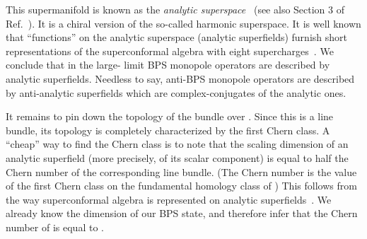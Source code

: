 \documentclass[a4paper,12pt, amsfonts, amssymb]{article}
\providecommand{\CC}{{\mathbb C}}
\providecommand{\PP}{{\mathbb P}}
\renewcommand{\L}{{\mathcal L}}
\begin{document}
This supermanifold is known as the {\it analytic superspace}~\cite{HSorig1,HSorig2,HS} (see also
Section 3 of Ref.~\cite{Z}).
It is a chiral version of the so-called harmonic superspace. 
It is well known that ``functions'' on the analytic superspace (analytic
superfields) furnish short representations of the superconformal algebra 
with eight supercharges~\cite{HS}. We conclude that in the large-\coordHE{} 
limit BPS monopole operators are described by \coordHE{}  \coordHE{} analytic superfields.
Needless to say, anti-BPS monopole operators are described by anti-analytic
superfields which are complex-conjugates of the analytic ones.

It remains to pin down the topology of the bundle \myHighlight{$\L$}\coordHE{}
over \myHighlight{$\CC\PP^1$}\coordHE{}. Since this is a line bundle, its topology is completely
characterized by the first Chern class. A ``cheap'' way to find the Chern
class is to note
that the scaling dimension of an analytic superfield
(more precisely, of its scalar component) is equal to half the Chern
number of the corresponding line bundle. (The Chern number is the value
of the first Chern class on the fundamental homology class of \myHighlight{$\CC\PP^1.$}\coordHE{}) 
This follows from the way superconformal algebra is represented on analytic 
superfields~\cite{HS}. We already know the dimension of our BPS state,
and therefore infer that the Chern number of \myHighlight{$\L$}\coordHE{} is equal to \coordHE{}.
\end{document}
